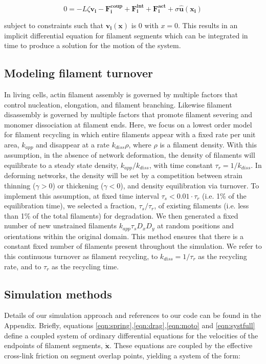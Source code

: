 \begin{equation}
\label{eqn:systfull}
0=-L\zeta\mathbf{ v_i} -\mathbf{F^{coup}_i}+ \mathbf{F^{int}_i}+\mathbf{F^{act}_i} + \sigma\mathbf{\hat{u}(x_i)}
\end{equation}

subject to constraints such that $\mathbf{v_i(x)}$ is 0 with $x=0$.  This results in an implicit differential equation for filament segments which can be integrated in time to produce a solution for the motion of the system.


\subsection{Modeling filament turnover}

In living cells, actin filament assembly is governed by multiple factors that control nucleation, elongation, and filament branching. Likewise filament disassembly is governed by multiple factors that promote filament severing and monomer dissociation at filament ends. Here, we focus on a lowest order model for filament recycling in which entire filaments appear with a fixed rate per unit area, $k_{app}$ and disappear at a rate $k_{diss}\rho$, where $\rho$ is a filament density. With this assumption, in the absence of network deformation, the density of filaments will equilibrate to a steady state density, $k_{app}/k_{diss}$, with time constant $\tau_r = 1/k_{diss}$.   In deforming networks, the density will be set by a competition between strain thinning ($\gamma>0$) or thickening ($\gamma<0$), and density equilibration via turnover. To implement this assumption, at fixed time interval $\tau_s < 0.01\cdot\tau_r$ (i.e. 1\% of the equilibration time), we selected a fraction, $\tau_s/\tau_r$, of existing filaments (i.e. less than 1\% of the total filaments) for degradation. We then generated a fixed number of new unstrained filaments $k_{app}\tau_sD_xD_y$ at random positions and orientations within the original domain.   This method ensures that there is a constant fixed number of filaments present throughout the simulation. We refer to this continuous turnover as filament recycling, to $k_{diss}=1/\tau_r$ as the recycling rate, and to $\tau_r$ as the recycling time.


\subsection{Simulation methods}

Details of our simulation approach and references to our code can be found in the Appendix. Briefly, equations \ref{eqn:spring},\ref{eqn:drag},\ref{eqn:moto} and \ref{eqn:systfull} define a coupled system of ordinary differential equations for the velocities of the endpoints of filament segments, $\mathbf{\dot{x}}$.  These equations are coupled by the effective cross-link friction on segment overlap points, yielding a system of the form:

